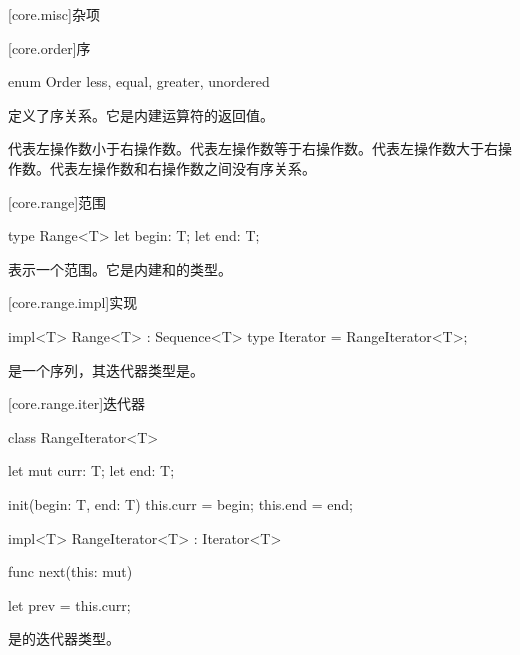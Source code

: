 
[core.misc]{杂项}

[core.order]{序}

\begin{itemdecl}
enum Order {
    less,
    equal,
    greater,
    unordered
}
\end{itemdecl}

\pnum
{}定义了序关系。它是内建运算符的返回值。

\pnum
{}代表左操作数小于右操作数。代表左操作数等于右操作数。代表左操作数大于右操作数。代表左操作数和右操作数之间没有序关系。

[core.range]{范围}

\begin{itemdecl}
type Range<T> {
    let begin: T;
    let end: T;
}
\end{itemdecl}

\pnum
{}表示一个范围。它是内建和的类型。

[core.range.impl]{实现}

\begin{itemdecl}
impl<T> Range<T> : Sequence<T> {
    type Iterator = RangeIterator<T>;
}
\end{itemdecl}

\pnum
{}是一个序列，其迭代器类型是。

[core.range.iter]{迭代器}

\begin{itemdecl}
class RangeIterator<T> {
    let mut curr: T;
    let end: T;

    init(begin: T, end: T) {
        this.curr = begin;
        this.end = end;
    }
}

impl<T> RangeIterator<T> : Iterator<T> {
    func next(this: mut) {


        let prev = this.curr;
    }
}
\end{itemdecl}

\pnum
{}是的迭代器类型。
